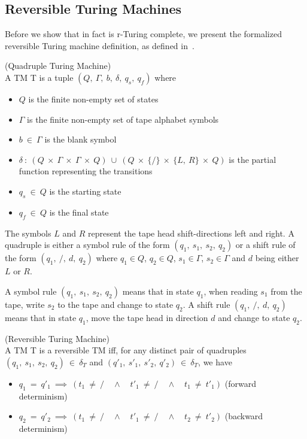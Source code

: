 \subsection{Reversible Turing Machines}
\label{subsec:reversible-turing-machine}
Before we show that \rooplpp in fact is r-Turing complete, we present the formalized reversible Turing machine definition, as defined in~\cite{ty:ejanus}.
\vspace{4mm}
\begin{definition}
    \label{def:quadruple-tm}(Quadruple Turing Machine)\vspace{4mm}\\
    \noindent A TM T is a tuple $(Q,\ \Gamma,\ b,\ \delta,\ q_s,\ q_f)$ where
    \begin{itemize}[label = {}, itemsep = 1pt]
        \item $Q$ is the finite non-empty set of states
        \item $\Gamma$ is the finite non-empty set of tape alphabet symbols
        \item $b\ \in\ \Gamma$ is the blank symbol
        \item $\delta\ :\ (Q\ \times\ \Gamma\ \times\ \Gamma\ \times\ Q)\ \cup\ (Q\ \times\ \{/\}\ \times\ \{L,\ R\}\ \times\ Q)$ is the partial function representing the transitions
        \item $q_s\ \in\ Q$ is the starting state
        \item $q_f\ \in\ Q$ is the final state
    \end{itemize}
    The symbols $L$ and $R$ represent the tape head shift-directions left and right. A quadruple is either a symbol rule of the form $(q_1,\ s_1,\ s_2,\ q_2)$ or a shift rule of the form $(q_1,\ /,\ d,\ q_2)$ where $q_1 \in Q$, $q_2 \in Q$, $s_1 \in \Gamma$, $s_2 \in \Gamma$ and $d$ being either $L$ or $R$.
    
    A symbol rule $(q_1,\ s_1,\ s_2,\ q_2)$ means that in state $q_1$, when reading $s_1$ from the tape, write $s_2$ to the tape and change to state $q_2$. A shift rule $(q_1,\ /,\ d,\ q_2)$ means that in state $q_1$, move the tape head in direction $d$ and change to state $q_2$.
\end{definition}
\vspace{4mm}
\begin{definition}
    \label{def:reversible-tm}(Reversible Turing Machine)\vspace{4mm}\\
    \noindent A TM T is a reversible TM iff, for any distinct pair of quadruples $(q_1,\ s_1,\ s_2,\ q_2)\ \in\ \delta_T$ and $(q'_1,\ s'_1,\ s'_2,\ q'_2)\ \in\ \delta_T$, we have
    \begin{itemize}[label = {}, itemsep = 1pt]
        \item $q_1\ =\ q'_1\ \implies\ (t_1\ \neq\ / \quad \wedge \quad t'_1\ \neq\ / \quad \wedge \quad t_1\ \neq\ t'_1)$ (forward determinism)
        \item $q_2\ =\ q'_2\ \implies\ (t_1\ \neq\ / \quad \wedge \quad t'_1\ \neq\ / \quad \wedge \quad t_2\ \neq\ t'_2)$ (backward determinism)
    \end{itemize}
\end{definition}

